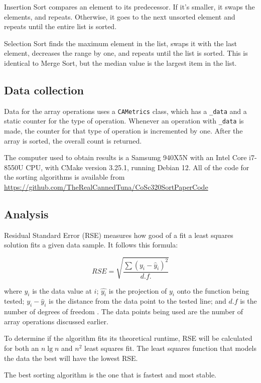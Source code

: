 \documentclass[10pt,fleqn]{article}
\begin{document}
Insertion Sort compares an element to its predecessor. If it's smaller, it swaps the elements, and repeats. Otherwise, it goes to the next unsorted element and repeats until the entire list is sorted. 

Selection Sort finds the maximum element in the list, swaps it with the last element, decreases the range by one, and repeats until the list is sorted. This is identical to Merge Sort, but the median value is the largest item in the list.

\subsection{Data collection}

Data for the array operations uses a \verb|CAMetrics| class, which has a \verb|_data| and a static counter for the type of operation. Whenever an operation with \verb|_data| is made, the counter for that type of operation is incremented by one. After the array is sorted, the overall count is returned.

The computer used to obtain results is a Samsumg 940X5N with an Intel Core i7-8550U CPU, with CMake version 3.25.1, running Debian 12. All of the code for the sorting algorithms is available from \url{https://github.com/TheRealCannedTuna/CoSc320SortPaperCode}

\subsection{Analysis}

Residual Standard Error (RSE) measures how good of a fit a least squares solution fits a given data sample. It follows this formula: 

\[
RSE =\sqrt{\frac{\sum{(y_i-\hat{y}_i)^2}}{d.f.}}
\]

where $y_i$ is the data value at $i$; $\hat{y_i}$ is the projection of $y_i$ onto the function being tested; $y_i-\hat{y}_i$ is the distance from the data point to the tested line; and $d.f$ is the number of degrees of freedom \cite{Choueiry_2020} . The data points being used are the number of array operations discussed earlier.

To determine if the algorithm fits its theoretical runtime, RSE will be calculated for both an $n\lg n$ and $n^2$ least squares fit. The least squares function that models the data the best will have the lowest RSE.

The best sorting algorithm is the one that is fastest and most stable.
\end{document}
